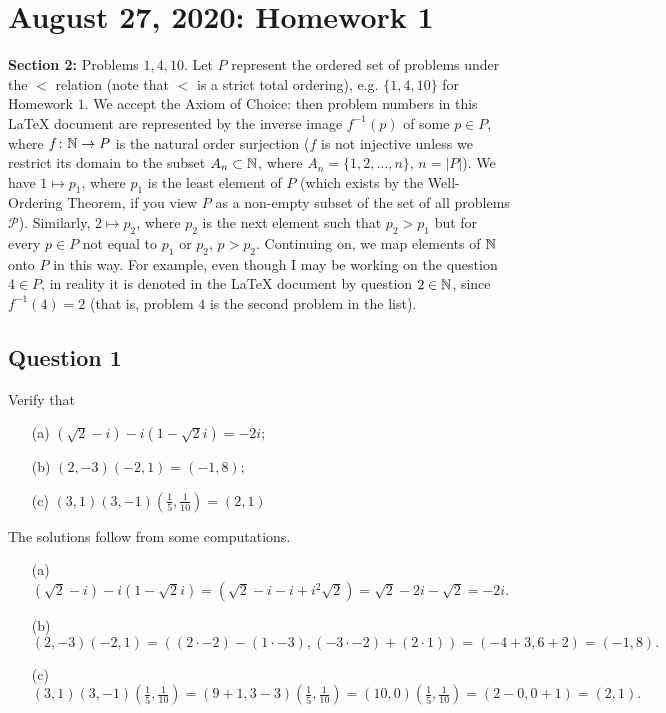 \section{August 27, 2020: Homework 1}
\textbf{Section 2:} Problems $1, 4, 10$. Let $P$ represent the ordered set of problems under the $<$ relation (note that $<$ is a strict total ordering), e.g. $\{ 1,4,10 \}$ for Homework $1$. We accept the Axiom of Choice: then problem numbers in this \LaTeX{} document are represented by the inverse image $f^{-1}(p)$ of some $p \in P$, where $f \colon \mathbb{N} \to P$ is the natural order surjection ($f$ is not injective unless we restrict its domain to the subset $A_n \subset \mathbb{N}$, where $A_n = \{1,2, ... , n\}$, $n=|P|$). We have $1 \mapsto p_1$, where $p_1$ is the least element of $P$ (which exists by the Well-Ordering Theorem, if you view $P$ as a non-empty subset of the set of all problems $\mathscr{P}$). Similarly, $2 \mapsto p_2$, where $p_2$ is the next element such that $p_2 > p_1$ but for every $p \in P$ not equal to $p_1$ or $p_2$, $p > p_2.$ Continuing on, we map elements of $\mathbb{N}$ onto $P$ in this way. For example, even though I may be working on the question $4 \in P$, in reality it is denoted in the \LaTeX{} document by question $2 \in \mathbb{N}$, since $f^{-1}(4)=2$ (that is, problem $4$ is the second problem in the list).

\subsection{Question 1}
\begin{prob}
    Verify that
    \begin{enumerate}
        \item[(a)] $(\sqrt{2} - i) - i(1-\sqrt{2} i)=-2i;$ 
        \item[(b)] $(2,-3)(-2, 1) = (-1,8);$ 
        \item[(c)] $(3,1)(3,-1)\left( \frac{1}{5},\frac{1}{10} \right) =(2,1)$
    \end{enumerate}
\end{prob}
\begin{solution}
    The solutions follow from some computations.
    \begin{enumerate}
        \item[(a)] $(\sqrt{2} -i)-i(1-\sqrt{2} i)  = (\sqrt{2} -i-i+i^2\sqrt{2} ) = \sqrt{2} -2i-\sqrt{2} = -2i$.
        \item[(b)] $(2,-3)(-2,1)=(\left( 2\cdot-2 \right)  - \left( 1\cdot -3 \right) , \left( -3\cdot -2 \right)  + \left( 2\cdot1 \right) ) = (-4+3, 6+2)=(-1,8).$
        \item[(c)] $(3,1)(3,-1)\left( \frac{1}{5},\frac{1}{10} \right) = (9+1,3-3)\left( \frac{1}{5},\frac{1}{10} \right) = (10,0)\left( \frac{1}{5},\frac{1}{10} \right) = (2-0, 0+1)=(2,1). $
    \end{enumerate}
\end{solution}
    
